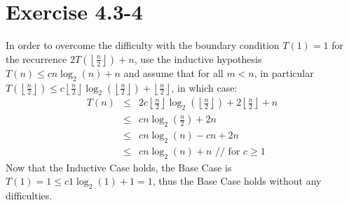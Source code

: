 \documentclass{article}
\begin{document}
\section*{Exercise 4.3-4}

In order to overcome the difficulty with the boundary condition $T(1) = 1$ for the recurrence $2T\left(\left\lfloor \frac{n}{2} \right\rfloor\right) + n$, use the inductive hypothesis $T(n) \leq cn \log_2(n) + n$ and assume that for all $m < n$, in particular $T\left(\left\lfloor \frac{n}{2} \right\rfloor\right) \leq c \left\lfloor \frac{n}{2} \right\rfloor \log_2 \left(\left\lfloor \frac{n}{2} \right\rfloor\right) + \left\lfloor \frac{n}{2} \right\rfloor$, in which case:
\begin{eqnarray*}
	T(n) &\leq& 2c\left\lfloor \frac{n}{2} \right\rfloor \log_2\left(\left\lfloor \frac{n}{2} \right\rfloor\right) + 2\left\lfloor \frac{n}{2} \right\rfloor + n \\
	 &\leq& cn\log_2\left(\frac{n}{2}\right) + 2n \\
	 &\leq& cn\log_2(n) - cn + 2n \\
	 &\leq& cn\log_2(n) + n \text{ // for $c \geq 1$}
\end{eqnarray*}
Now that the Inductive Case holds, the Base Case is $T(1) = 1 \leq c1\log_2(1) + 1 = 1$, thus the Base Case holds without any difficulties.
\end{document}
